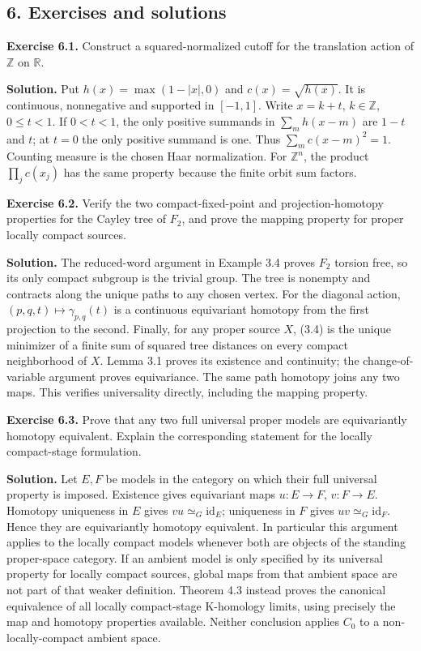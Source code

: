 \documentclass[
  11pt,
]{article}
\begin{document}
\subsection{6. Exercises and solutions}\label{exercises-and-solutions}

\textbf{Exercise 6.1.} Construct a squared-normalized cutoff for the
translation action of \(\mathbb Z\) on \(\mathbb R\).

\textbf{Solution.} Put \(h(x)=\max(1-|x|,0)\) and \(c(x)=\sqrt{h(x)}\).
It is continuous, nonnegative and supported in \([-1,1]\). Write
\(x=k+t\), \(k\in\mathbb Z\), \(0\le t<1\). If \(0<t<1\), the only
positive summands in \(\sum_m h(x-m)\) are \(1-t\) and \(t\); at \(t=0\)
the only positive summand is one. Thus \(\sum_m c(x-m)^2=1\). Counting
measure is the chosen Haar normalization. For \(\mathbb Z^n\), the
product \(\prod_jc(x_j)\) has the same property because the finite orbit
sum factors.

\textbf{Exercise 6.2.} Verify the two compact-fixed-point and
projection-homotopy properties for the Cayley tree of \(F_2\), and prove
the mapping property for proper locally compact sources.

\textbf{Solution.} The reduced-word argument in Example 3.4 proves
\(F_2\) torsion free, so its only compact subgroup is the trivial group.
The tree is nonempty and contracts along the unique paths to any chosen
vertex. For the diagonal action, \((p,q,t)\mapsto\gamma_{p,q}(t)\) is a
continuous equivariant homotopy from the first projection to the second.
Finally, for any proper source \(X\), (3.4) is the unique minimizer of a
finite sum of squared tree distances on every compact neighborhood of
\(X\). Lemma 3.1 proves its existence and continuity; the
change-of-variable argument proves equivariance. The same path homotopy
joins any two maps. This verifies universality directly, including the
mapping property.

\textbf{Exercise 6.3.} Prove that any two full universal proper models
are equivariantly homotopy equivalent. Explain the corresponding
statement for the locally compact-stage formulation.

\textbf{Solution.} Let \(E,F\) be models in the category on which their
full universal property is imposed. Existence gives equivariant maps
\(u:E\to F\), \(v:F\to E\). Homotopy uniqueness in \(E\) gives
\(vu\simeq_G\mathrm{id}_E\); uniqueness in \(F\) gives
\(uv\simeq_G\mathrm{id}_F\). Hence they are equivariantly homotopy
equivalent. In particular this argument applies to the locally compact
models whenever both are objects of the standing proper-space category.
If an ambient model is only specified by its universal property for
locally compact sources, global maps from that ambient space are not
part of that weaker definition. Theorem 4.3 instead proves the canonical
equivalence of all locally compact-stage K-homology limits, using
precisely the map and homotopy properties available. Neither conclusion
applies \(C_0\) to a non-locally-compact ambient space.
\end{document}
